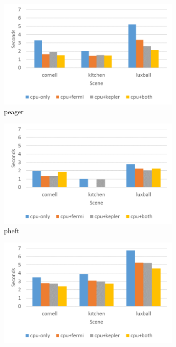 \documentclass[main.tex]{subfiles}
\begin{document}
\begin{figure}[!htp]
  \centering
  \begin{subfigure}{.5\textwidth}
    \centering
    \includegraphics[width=\linewidth]{profiling/starpu_sched_peager}
    \caption{peager \label{fig:prof:starpu_sched_peager}}
  \end{subfigure}%
  \begin{subfigure}{.5\textwidth}
    \centering
    \includegraphics[width=\linewidth]{profiling/starpu_sched_pheft}
    \caption{pheft \label{fig:prof:starpu_sched_pheft}}
  \end{subfigure}
  \begin{subfigure}{.5\textwidth}
    \centering
    \includegraphics[width=\linewidth]{profiling/starpu_sched_dm}

\end{subfigure}
\end{figure}
\end{document}
